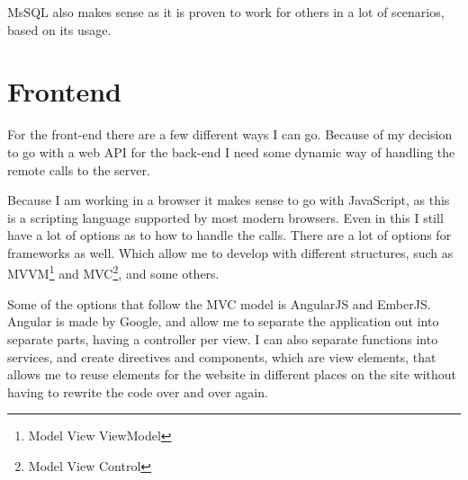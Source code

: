 MsSQL also makes sense as it is proven to work for others in a lot of scenarios,
based on its usage\cite{obdms:gartner}. 

\begin{table}[h]
  \caption{Pros and cons of different types of databases}
  \label{tab:sedatabse-pro-con}
\end{table}

\section{Frontend}
\label{sec:Frontend}
For the front-end there are a few different ways I can go. Because of my
decision to go with a web API for the back-end I need some dynamic way of
handling the remote calls to the server. 

Because I am working in a browser it makes sense to go with JavaScript, as this
is a scripting language supported by most modern browsers. Even in this I still
have a lot of options as to how to handle the calls. There are a lot of options
for frameworks as well. Which allow me to develop with different structures,
such as MVVM\footnote{Model View ViewModel} and MVC\footnote{Model View
  Control}, and some others. 

Some of the options that follow the MVC model is AngularJS and EmberJS. Angular
is made by Google\cite{angularjs}, and allow me to separate the application out
into separate parts, having a controller per view. I can also separate functions
into services, and create directives and components, which are view elements,
that allows me to reuse elements for the website in different places on the site
without having to rewrite the code over and over again. 

